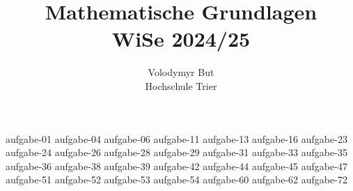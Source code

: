 \documentclass[10pt, oneside]{article}
\title{Mathematische Grundlagen\\[10pt]\Large{WiSe 2024/25}}
\author{Volodymyr But\\[10pt]Hochschule Trier}
\date{}
\begin{document}
\sloppy

\maketitle
\vspace{25px}

{aufgabe-01}
{aufgabe-04}
{aufgabe-06}
{aufgabe-11}
{aufgabe-13}
{aufgabe-16}
{aufgabe-23}
{aufgabe-24}
{aufgabe-26}
{aufgabe-28}
{aufgabe-29}
{aufgabe-31}
\pagebreak
{aufgabe-33}
\pagebreak
{aufgabe-35}
{aufgabe-36}
{aufgabe-38}
{aufgabe-39}
{aufgabe-42}
{aufgabe-44}
{aufgabe-45}
{aufgabe-47}
{aufgabe-51}
{aufgabe-52}
{aufgabe-53}
{aufgabe-54}
{aufgabe-60}
\pagebreak
{aufgabe-62}
{aufgabe-72}
\end{document}
